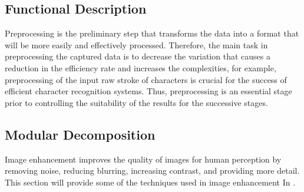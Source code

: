 \subsection{Functional Description}
Preprocessing is the preliminary step that transforms the data into a format that will be more easily and effectively processed. Therefore, the main task in preprocessing the captured data is to decrease the variation that causes a reduction in the efficiency  rate and increases the complexities, for example, preprocessing of the input raw stroke of characters is crucial for the success of efficient character recognition systems. Thus, preprocessing is an essential stage prior to controlling the suitability of the results for the successive stages. 


\subsection{Modular Decomposition}
Image enhancement improves the quality of images for human perception by removing noise, reducing blurring, increasing contrast, and providing more detail. This section will provide some of the techniques used in image enhancement In \cite{inbook}. 

